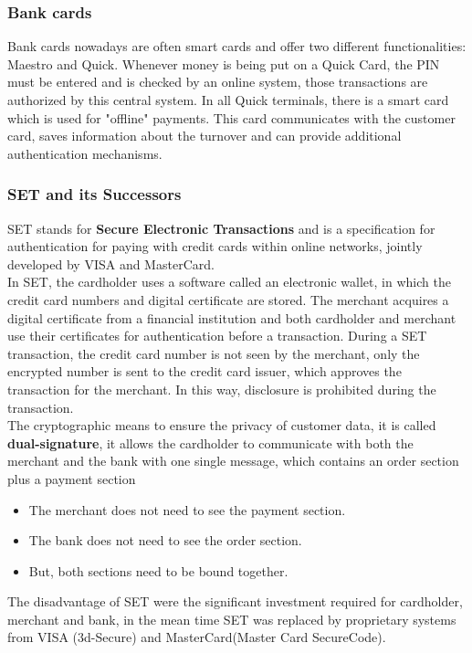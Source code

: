 \documentclass[a4paper, 10 pt, conference]{ieeeconf}
\begin{document}
\vspace{0.5cm}
\subsubsection{\textbf{Bank cards}}
Bank cards nowadays are often smart cards and offer two different functionalities: Maestro and Quick. Whenever money is being put on a Quick Card, the PIN must be entered and is checked by an online system, those transactions are authorized by this central system. 
In all Quick terminals, there is a smart card which is used for "offline" payments. This card communicates with the customer card, saves information about the turnover and can provide additional authentication mechanisms. 
\vspace{0.5cm}
\subsubsection{\textbf{SET and its Successors}}
SET stands for \textbf{Secure Electronic Transactions} and is a specification for authentication for paying with credit cards within online networks, jointly developed by VISA and MasterCard. \\
In SET, the cardholder uses a software called an electronic wallet, in which the credit card numbers and digital certificate are stored. The merchant acquires a digital certificate from a financial institution and both cardholder and merchant use their certificates for authentication before a transaction. 
During a SET transaction, the credit card number is not seen by the merchant, only the encrypted number is sent to the credit card issuer, which approves the transaction for the merchant. In this way, disclosure is prohibited during the transaction. \\
The cryptographic means to ensure the privacy of customer data, it is called \textbf{dual-signature}, it allows the cardholder to communicate with both the merchant and the bank with one single message, which contains an order section plus a payment section
\begin{itemize}
\item The merchant does not need to see the payment section.
\item The bank does not need to see the order section. 
\item But, both sections need to be bound together. 
\end{itemize}
The disadvantage of SET were the significant investment required for cardholder, merchant and bank, in the mean time SET was replaced by proprietary systems from VISA (3d-Secure) and MasterCard(Master Card SecureCode). 
\end{document}
